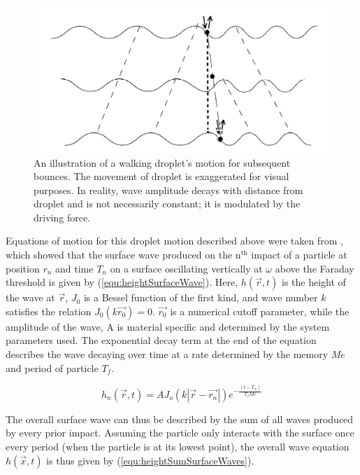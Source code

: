 \begin{figure}[ht]
\includegraphics[width=12cm]{theory/walkingDroplet}
\centering
\caption{An illustration of a walking droplet's motion for subsequent bounces. The movement of droplet is exaggerated for visual purposes. In reality, wave amplitude decays with distance from droplet and is not necessarily constant; it is modulated by the driving force. }
\centering
\label{walker}

\end{figure}

Equations of motion for this droplet motion described above were taken from \cite{oza2013trajectory}, which showed that the surface wave produced on the $\textrm{n}^{\textrm{th}}$ impact of a particle at position $r_n$ and time $T_n$ on a surface oscillating vertically at $\omega$ above the Faraday threshold is given by (\ref{equ:heightSurfaceWave}). Here, $ h(\vec{r} , t)$ is the height of the wave at $\vec{r}$, $J_0$ is a Bessel function of the first kind, and wave number $k$ satisfies the relation $ J_0 \left( k \vec{r_0} \right) = 0$. $\vec{r_0}$ is a numerical cutoff parameter, while the amplitude of the wave, A is material specific and determined by the system parameters used. The exponential decay term at the end of the equation describes the wave decaying over time at a rate determined by the memory $Me$ and period of particle $T_f$.

\begin{equation}
h_n(\vec{r} , t) = A J_o\left(k\left|\vec{r} - \vec{r_n}\right| \right) e^{-\frac{\left(t-T_n\right)}{T_f Me}}
\label{equ:heightSurfaceWave}
\end{equation}

The overall surface wave can thus be described by the sum of all waves produced by every prior impact. Assuming the particle only interacts with the surface once every period (when the particle is at its lowest point), the overall wave equation $h (\vec{x} , t)$ is thus given by (\ref{equ:heightSumSurfaceWaves}).

